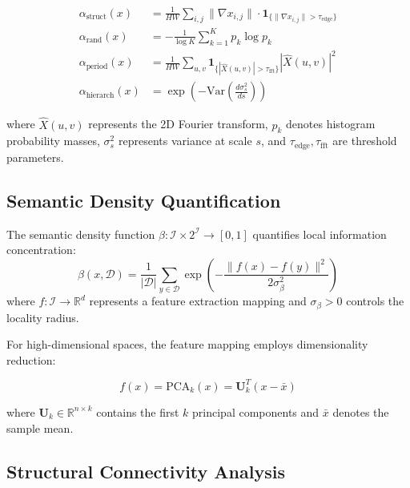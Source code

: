 \begin{align}
\alpha_{\text{struct}}(x) &= \frac{1}{HW} \sum_{i,j} \|\nabla x_{i,j}\| \cdot \mathbf{1}_{\{\|\nabla x_{i,j}\| > \tau_{\text{edge}}\}} \label{eq:structural-score}\\
\alpha_{\text{rand}}(x) &= -\frac{1}{\log K} \sum_{k=1}^K p_k \log p_k \label{eq:randomness-score}\\
\alpha_{\text{period}}(x) &= \frac{1}{HW} \sum_{u,v} \mathbf{1}_{\{|\hat{X}(u,v)| > \tau_{\text{fft}}\}} |\hat{X}(u,v)|^2 \label{eq:periodicity-score}\\
\alpha_{\text{hierarch}}(x) &= \exp\left(-\text{Var}\left(\frac{d\sigma_s^2}{ds}\right)\right) \label{eq:hierarchical-score}
\end{align}

where $\hat{X}(u,v)$ represents the 2D Fourier transform, $p_k$ denotes histogram probability masses, $\sigma_s^2$ represents variance at scale $s$, and $\tau_{\text{edge}}, \tau_{\text{fft}}$ are threshold parameters.

\subsection{Semantic Density Quantification}

\begin{definition}
The semantic density function $\beta: \mathcal{I} \times 2^{\mathcal{I}} \to [0,1]$ quantifies local information concentration:
\begin{equation}
\beta(x, \mathcal{D}) = \frac{1}{|\mathcal{D}|} \sum_{y \in \mathcal{D}} \exp\left(-\frac{\|f(x) - f(y)\|^2}{2\sigma_{\beta}^2}\right)
\label{eq:semantic-density}
\end{equation}
where $f: \mathcal{I} \to \mathbb{R}^d$ represents a feature extraction mapping and $\sigma_{\beta} > 0$ controls the locality radius.
\end{definition}

For high-dimensional spaces, the feature mapping employs dimensionality reduction:

\begin{equation}
f(x) = \text{PCA}_k(x) = \mathbf{U}_k^T (x - \bar{x})
\label{eq:feature-mapping}
\end{equation}

where $\mathbf{U}_k \in \mathbb{R}^{n \times k}$ contains the first $k$ principal components and $\bar{x}$ denotes the sample mean.

\subsection{Structural Connectivity Analysis}

